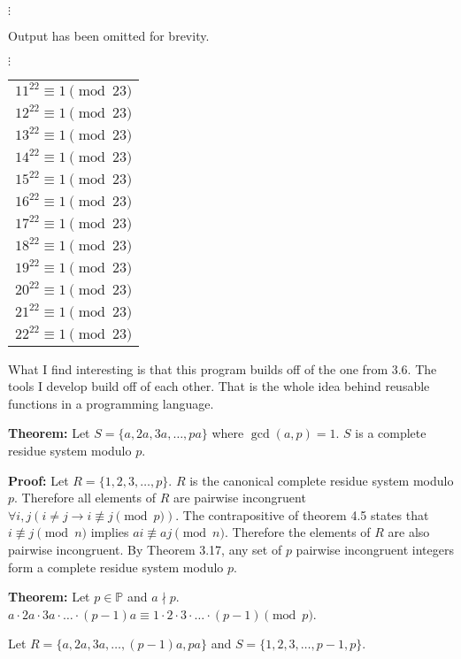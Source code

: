 \(\vdots\)

Output has been omitted for brevity.

\(\vdots\)

\begin{tabular}[t]{l}
$11^{22} \equiv 1 \pmod {23}$ \\
$12^{22} \equiv 1 \pmod {23}$ \\
$13^{22} \equiv 1 \pmod {23}$ \\
$14^{22} \equiv 1 \pmod {23}$ \\
$15^{22} \equiv 1 \pmod {23}$ \\
$16^{22} \equiv 1 \pmod {23}$ \\
$17^{22} \equiv 1 \pmod {23}$ \\
$18^{22} \equiv 1 \pmod {23}$ \\
$19^{22} \equiv 1 \pmod {23}$ \\
$20^{22} \equiv 1 \pmod {23}$ \\
$21^{22} \equiv 1 \pmod {23}$ \\
$22^{22} \equiv 1 \pmod {23}$ \\
\end{tabular}

What I find interesting is that this program builds off of the one from 3.6. The tools I develop build off of each other. That is the whole idea behind reusable functions in a programming language.

\item \textbf{Theorem:} Let \(S = \{a, 2a, 3a, \dots, pa\}\) where \(\gcd(a, p) = 1\). \(S\) is a complete residue system modulo \(p\).

\textbf{Proof:} Let \(R = \{1, 2, 3, \dots, p\}\). \(R\) is the canonical complete residue system modulo \(p\). Therefore all elements of \(R\) are pairwise incongruent \(\forall i, j (i \neq j \rightarrow i \not\equiv j \pmod p)\). The contrapositive of theorem 4.5 states that \(i \not\equiv j \pmod n\) implies \(ai \not\equiv aj \pmod n\). Therefore the elements of \(R\) are also pairwise incongruent. By Theorem 3.17, any set of \(p\) pairwise incongruent integers form a complete residue system modulo \(p\).

\item \textbf{Theorem:} Let \(p \in \mathbb P\) and \(a \nmid p\). \(a \cdot 2a \cdot 3a \cdot \dots \cdot (p-1)a \equiv 1 \cdot 2 \cdot 3 \cdot \dots \cdot (p-1) \pmod p\).

Let \(R = \{a, 2a, 3a, \dots, (p-1)a, pa\}\) and \(S = \{1, 2, 3, \dots, p-1, p\}\).

